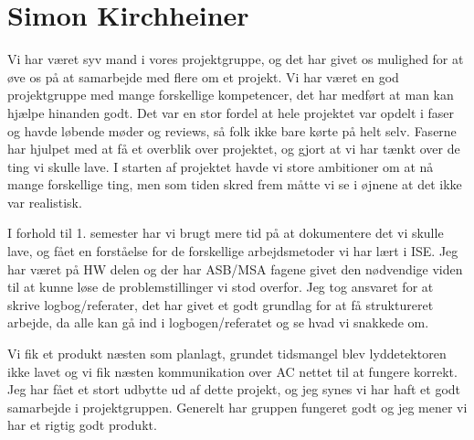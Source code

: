 \section{Simon Kirchheiner}
Vi har været syv mand i vores projektgruppe, og det har givet os mulighed for at øve os på at samarbejde med flere om et projekt. Vi har været en god projektgruppe med mange forskellige kompetencer, det har medført at man kan hjælpe hinanden godt. Det var en stor fordel at hele projektet var opdelt i faser og havde løbende møder og reviews, så folk ikke bare kørte på helt selv. Faserne har hjulpet med at få et overblik over projektet, og gjort at vi har tænkt over de ting vi skulle lave. I starten af projektet havde vi store ambitioner om at nå mange forskellige ting, men som tiden skred frem måtte vi se i øjnene at det ikke var realistisk. 

I forhold til 1. semester har vi brugt mere tid på at dokumentere det vi skulle lave, og fået en forståelse for de forskellige arbejdsmetoder vi har lært i ISE. Jeg har været på HW delen og der har ASB/MSA fagene givet den nødvendige viden til at kunne løse de problemstillinger vi stod overfor. Jeg tog ansvaret for at skrive logbog/referater, det har givet et godt grundlag for at få struktureret arbejde, da alle kan gå ind i logbogen/referatet og se hvad vi snakkede om.

Vi fik et produkt næsten som planlagt, grundet tidsmangel blev lyddetektoren ikke lavet og vi fik næsten kommunikation over AC nettet til at fungere korrekt. Jeg har fået et stort udbytte ud af dette projekt, og jeg synes vi har haft et godt samarbejde i projektgruppen. Generelt har gruppen fungeret godt og jeg mener vi har et rigtig godt produkt.
